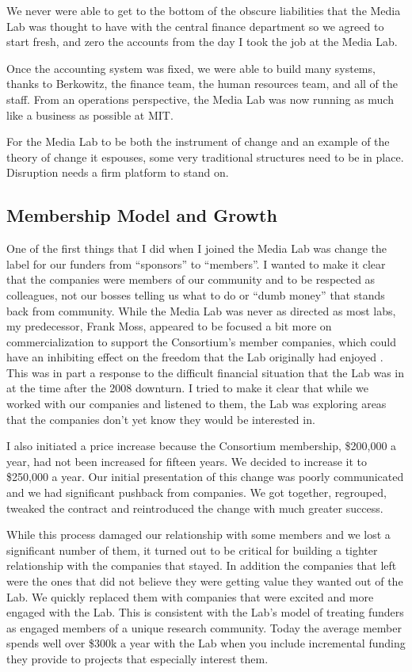 We never were able to get to the bottom of the obscure liabilities that the Media Lab was thought to have with the central finance department so we agreed to start fresh, and zero the accounts from the day I took the job at the Media Lab.

Once the accounting system was fixed, we were able to build many systems, thanks to Berkowitz, the finance team, the human resources team, and all of the staff. From an operations perspective, the Media Lab was now running as much like a business as possible at MIT.

For the Media Lab to be both the instrument of change and an example of the theory of change it espouses, some very traditional structures need to be in place. Disruption needs a firm platform to stand on.

\subsection{Membership Model and Growth}

One of the first things that I did when I joined the Media Lab was change the label for our funders from ``sponsors'' to ``members''. I wanted to make it clear that the companies were members of our community and to be respected as colleagues, not our bosses telling us what to do or ``dumb money'' that stands back from community. While the Media Lab was never as directed as most labs, my predecessor, Frank Moss, appeared to be focused a bit more on commercialization to support the Consortium's member companies, which could have an inhibiting effect on the freedom that the Lab originally had enjoyed \cite{FrankMos10:online}. This was in part a response to the difficult financial situation that the Lab was in at the time after the 2008 downturn. I tried to make it clear that while we worked with our companies and listened to them, the Lab was exploring areas that the companies don't yet know they would be interested in.

I also initiated a price increase because the Consortium membership, \$200,000 a year, had not been increased for fifteen years. We decided to increase it to \$250,000 a year. Our initial presentation of this change was poorly communicated and we had significant pushback from companies. We got together, regrouped, tweaked the contract and reintroduced the change with much greater success. 

While this process damaged our relationship with some members and we lost a significant number of them, it turned out to be critical for building a tighter relationship with the companies that stayed. In addition the companies that left were the ones that did not believe they were getting value they wanted out of the Lab. We quickly replaced them with companies that were excited and more engaged with the Lab. This is consistent with the Lab's model of treating funders as engaged members of a unique research community. Today the average member spends well over \$300k a year with the Lab when you include incremental funding they provide to projects that especially interest them.

